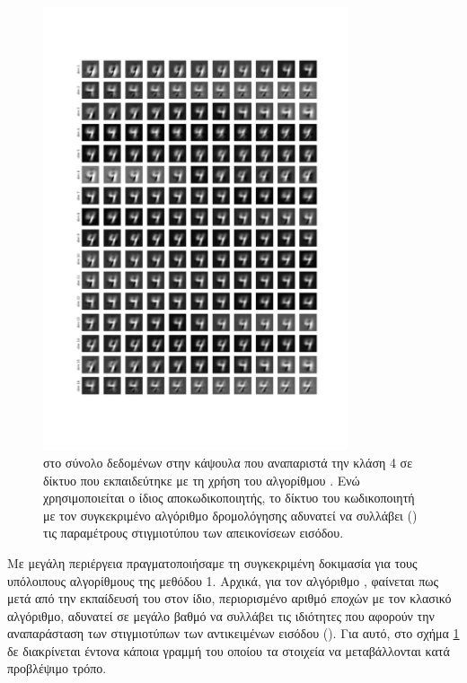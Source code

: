 \begin{figure}[h]
    \centering
    \includegraphics[width=0.8\textwidth]{images/chapter experiments/method 1/image 7/perturbations_19.png}
    \caption{ στο σύνολο δεδομένων  στην κάψουλα  που αναπαριστά την κλάση 4 σε δίκτυο που εκπαιδεύτηκε με τη χρήση του αλγορίθμου . Ενώ χρησιμοποιείται ο ίδιος αποκωδικοποιητής, το δίκτυο του κωδικοποιητή με τον συγκεκριμένο αλγόριθμο δρομολόγησης αδυνατεί να συλλάβει () τις παραμέτρους στιγμιοτύπου των απεικονίσεων εισόδου.}
    \label{fig:exp_method_1_special_perturb_2}
  \end{figure}
Με μεγάλη περιέργεια πραγματοποιήσαμε τη συγκεκριμένη δοκιμασία για τους υπόλοιπους αλγορίθμους της μεθόδου 1. Αρχικά, για τον αλγόριθμο , φαίνεται πως μετά από την εκπαίδευσή του στον ίδιο, περιορισμένο αριθμό εποχών με τον κλασικό αλγόριθμο, αδυνατεί σε μεγάλο βαθμό να συλλάβει τις ιδιότητες που αφορούν την αναπαράσταση των στιγμιοτύπων των αντικειμένων εισόδου (). Για αυτό, στο σχήμα \ref{fig:exp_method_1_special_perturb_2} δε διακρίνεται έντονα κάποια γραμμή του οποίου τα στοιχεία να μεταβάλλονται κατά προβλέψιμο τρόπο.\par

